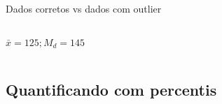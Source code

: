 \documentclass{beamer}
\begin{document}
\begin{frame}{\scriptsize Dados corretos vs dados com outlier}
\begin{columns}
\begin{column}{5cm}
\begin{center}
        \scriptsize
        \bigskip
        $\bar{x} = 125 ; M_d= 145$
      \end{center}
    \end{column}
  \end{columns}
\end{frame}



\subsection{Quantificando com percentis}
\end{document}
